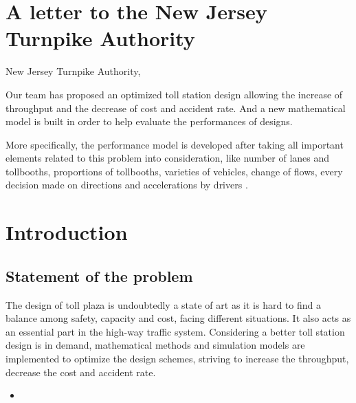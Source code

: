\documentclass{mcmthesis}
\begin{document}
\maketitle
\tableofcontents
\clearpage








\section{A letter to the New Jersey Turnpike Authority}


New Jersey Turnpike Authority,

Our team has proposed an optimized toll station design allowing the increase of throughput and the decrease of cost and accident rate. And a new mathematical model is built in order to help evaluate the performances of designs. 

More specifically, the performance model is developed after taking all important elements related to this problem into consideration, like number of lanes and tollbooths, proportions of tollbooths, varieties of vehicles, change of flows, every decision made on directions and accelerations by drivers . 



\section{Introduction}

\subsection{Statement of the problem}

The design of toll plaza is undoubtedly a state of art as it is hard to find a balance among safety, capacity and cost, facing different situations. It also acts as an essential part in the high-way traffic system. Considering a better toll station design is in demand, mathematical methods and simulation models are implemented to optimize the design schemes, striving to increase the throughput, decrease the cost and accident rate.



\begin{itemize}

\item 
\end{itemize}
\end{document}
